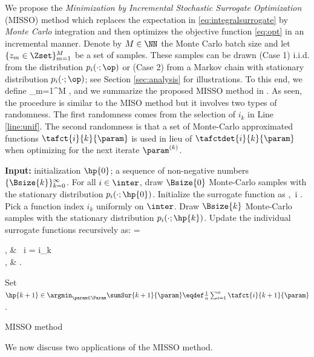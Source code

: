 \documentclass[11pt]{article}
\theoremstyle{t}
\begin{document}
We propose the \emph{Minimization by Incremental Stochastic Surrogate Optimization} (MISSO) method  which replaces the expectation in \eqref{eq:integralsurrogate} by \emph{Monte Carlo} integration and then optimizes the objective function \eqref{eq:opt} in an incremental manner.
Denote by $M \in \NN$ the Monte Carlo batch size and let $\{z_m \in \Zset\}_{m=1}^M$ be a set of samples. These samples can be drawn
{\sf (Case 1)} i.i.d. from the distribution $p_i( \cdot ; \op )$ or {\sf (Case 2)}  from a Markov chain with stationary distribution $p_{i}(\cdot; \op)$; see Section \ref{sec:analysis} for illustrations.
To this end, we define
\beq \label{eq:ssur}  
 \eqdef {} \sum_{m=1}^{M} \eqsp,
\eeq
and we summarize the proposed MISSO method in .
As seen, the procedure is similar to the MISO method but it involves two types of randomness. The first randomness comes from the selection of $i_k$ in Line \ref{line:unif}. The second randomness is that a set of Monte-Carlo approximated functions $\tafct{i}{k}{\param}$ is used in lieu of $\tafctdet{i}{k}{\param}$ when optimizing for the next iterate $\param^{(k)}$.
\begin{algorithm}[t]
\begin{algorithmic}[1]
\STATE \textbf{Input:} initialization $\hp{0}$; a sequence of non-negative numbers $\{ \Bsize{k} \}_{k=0}^\infty$.
\STATE For all $i \in \inter$, draw $\Bsize{0}$ Monte-Carlo samples with the stationary distribution $p_i(\cdot; \hp{0})$.
\STATE Initialize the surrogate function as
\beq\notag
{} \eqdef {},~i \in \inter \eqsp. \vspace{-.2cm}
\eeq
{}
\STATE \label{line:unif}Pick a function index $i_k$ uniformly on $\inter$.
\STATE Draw $\Bsize{k}$ Monte-Carlo samples with the stationary distribution $p_i(\cdot; \hp{k})$.
\STATE \label{line:ssur} Update the individual surrogate functions recursively as:
\beq\notag
{} = \begin{cases}
, & ~i = i_k \\
, & .
\end{cases}
\eeq
\STATE \label{line:iter} Set $\hp{k+1} \in \argmin_{ \param \in \Param } \sumSur{k+1}{\param} \eqdef  \frac{1}{n} \sum_{i=1}^n \tafct{i}{k+1}{\param}$.
\ENDFOR
\end{algorithmic}
\caption{MISSO method}
\label{alg:misso}
        \end{algorithm}
We now discuss two applications of the MISSO method.
\end{document}
